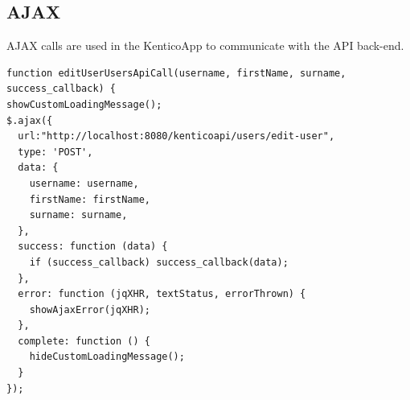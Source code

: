 \subsection{AJAX}
AJAX calls are used in the KenticoApp  to communicate with the API back-end.
\lstset{style=sharpc, numbers=left}
\begin{lstlisting}
function editUserUsersApiCall(username, firstName, surname, success_callback) {
showCustomLoadingMessage();
$.ajax({
  url:"http://localhost:8080/kenticoapi/users/edit-user",
  type: 'POST',
  data: {
    username: username,
    firstName: firstName,
    surname: surname,
  },
  success: function (data) {
    if (success_callback) success_callback(data);
  },
  error: function (jqXHR, textStatus, errorThrown) {
    showAjaxError(jqXHR);
  },
  complete: function () {
    hideCustomLoadingMessage();
  }
});
\end{lstlisting}
